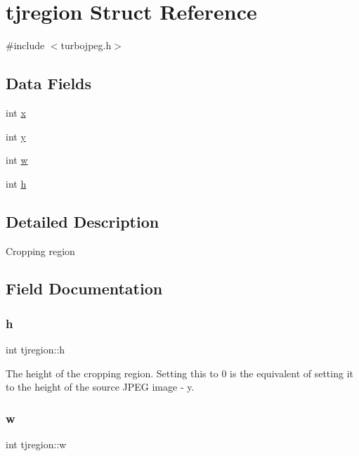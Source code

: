 \hypertarget{structtjregion}{}\section{tjregion Struct Reference}
\label{structtjregion}


{\ttfamily \#include $<$turbojpeg.\+h$>$}

\subsection*{Data Fields}
\begin{DoxyCompactItemize}
\item 
int \hyperlink{structtjregion_a4b6a37a93997091b26a75831fa291ad9}{x}
\item 
int \hyperlink{structtjregion_a7b3e0c24cfe87acc80e334cafdcf22c2}{y}
\item 
int \hyperlink{structtjregion_ab6eb73ceef584fc23c8c8097926dce42}{w}
\item 
int \hyperlink{structtjregion_aecefc45a26f4d8b60dd4d825c1710115}{h}
\end{DoxyCompactItemize}


\subsection{Detailed Description}
Cropping region 

\subsection{Field Documentation}
\mbox{\label{structtjregion_aecefc45a26f4d8b60dd4d825c1710115}} 
\subsubsection{\texorpdfstring{h}{h}}
{\footnotesize\ttfamily int tjregion\+::h}

The height of the cropping region. Setting this to 0 is the equivalent of setting it to the height of the source J\+P\+EG image -\/ y. \mbox{\label{structtjregion_ab6eb73ceef584fc23c8c8097926dce42}} 
\subsubsection{\texorpdfstring{w}{w}}
{\footnotesize\ttfamily int tjregion\+::w}

